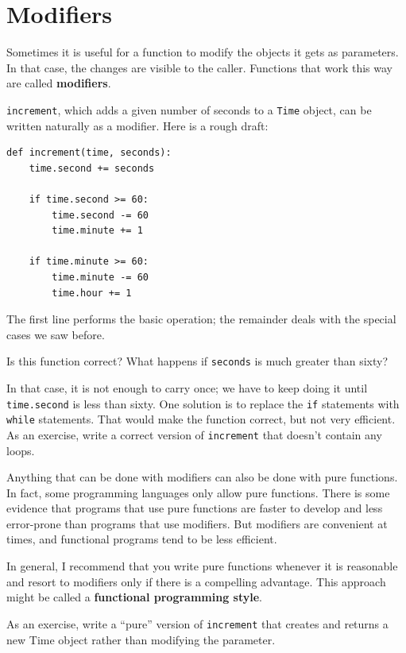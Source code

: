 \documentclass[10pt]{book}
\begin{document}
\section{Modifiers}
\label{increment}

Sometimes it is useful for a function to modify the objects it gets as
parameters.  In that case, the changes are visible to the caller.
Functions that work this way are called {\bf modifiers}.

{\tt increment}, which adds a given number of seconds to a {\tt Time}
object, can be written naturally as a
modifier.  Here is a rough draft:

\begin{verbatim}
def increment(time, seconds):
    time.second += seconds

    if time.second >= 60:
        time.second -= 60
        time.minute += 1

    if time.minute >= 60:
        time.minute -= 60
        time.hour += 1
\end{verbatim}
%
The first line performs the basic operation; the remainder deals
with the special cases we saw before.

Is this function correct?  What happens if {\tt seconds}
is much greater than sixty?  

In that case, it is not enough to carry once; we have to keep doing it
until {\tt time.second} is less than sixty.  One solution is to
replace the {\tt if} statements with {\tt while} statements.  That
would make the function correct, but not very efficient.  As an
exercise, write a correct version of {\tt increment} that doesn't
contain any loops.

Anything that can be done with modifiers can also be done with pure
functions.  In fact, some programming languages only allow pure
functions.  There is some evidence that programs that use pure
functions are faster to develop and less error-prone than programs
that use modifiers.  But modifiers are convenient at times,
and functional programs tend to be less efficient.

In general, I recommend that you write pure functions whenever it is
reasonable and resort to modifiers only if there is a compelling
advantage.  This approach might be called a {\bf functional
programming style}.

As an exercise, write a ``pure'' version of {\tt increment} that
creates and returns a new Time object rather than modifying the
parameter.
\end{document}
